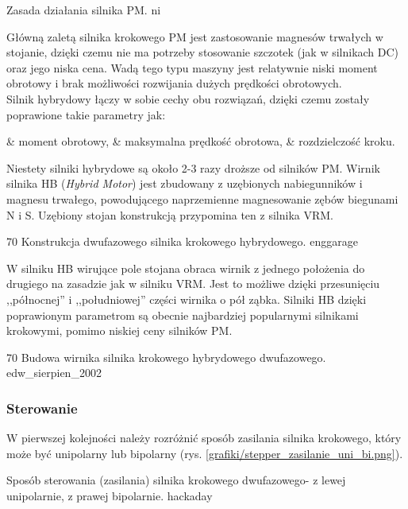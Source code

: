 		{Zasada działania silnika PM.}
		{ni}
		
Główną zaletą silnika krokowego PM jest zastosowanie magnesów trwałych w stojanie, dzięki czemu nie ma potrzeby stosowanie szczotek (jak w silnikach DC) oraz jego niska cena. Wadą tego typu maszyny jest relatywnie niski moment obrotowy i brak możliwości rozwijania dużych prędkości obrotowych. \\

Silnik hybrydowy łączy w sobie cechy obu rozwiązań, dzięki czemu zostały poprawione takie parametry jak:
\begin{easylist}
	& moment obrotowy, 
	& maksymalna prędkość obrotowa, 
	& rozdzielczość kroku.
	\\
\end{easylist}

Niestety silniki hybrydowe są około 2-3 razy droższe od silników PM. Wirnik silnika HB ({\em Hybrid Motor}) jest zbudowany z uzębionych nabiegunników i magnesu trwałego, powodującego naprzemienne magnesowanie zębów biegunami N i S. Uzębiony stojan konstrukcją przypomina ten z silnika VRM. 

		{70}
		{Konstrukcja dwufazowego silnika krokowego hybrydowego.}
		{enggarage}
		
W silniku HB wirujące pole stojana obraca wirnik z jednego położenia do drugiego na zasadzie jak w silniku VRM. Jest to możliwe dzięki przesunięciu ,,północnej'' i ,,południowej'' części wirnika o pół ząbka. Silniki HB dzięki poprawionym parametrom są obecnie najbardziej popularnymi silnikami krokowymi, pomimo niskiej ceny silników PM.
		
		{70}
		{Budowa wirnika silnika krokowego hybrydowego dwufazowego.}
		{edw_sierpien_2002}

\subsubsection{Sterowanie}
\label{sss:sterowanie_krokowy}

W pierwszej kolejności należy rozróżnić sposób zasilania silnika krokowego, który może być unipolarny lub bipolarny (rys. \ref{grafiki/stepper_zasilanie_uni_bi.png}).

		{Sposób sterowania (zasilania) silnika krokowego dwufazowego- z lewej unipolarnie, z prawej bipolarnie.}
		{hackaday}

